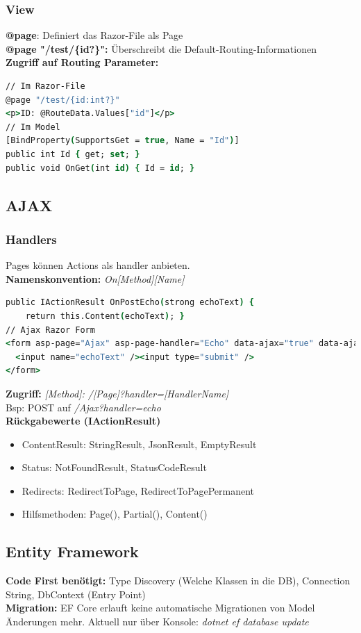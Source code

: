 \subsubsection{View}
\textbf{@page}: Definiert das Razor-File als Page\\
\textbf{@page "/test/\{id?\}":} Überschreibt die Default-Routing-Informationen\\
\textbf{Zugriff auf Routing Parameter:}
\begin{lstlisting}[language=csh]
// Im Razor-File
@page "/test/{id:int?}"
<p>ID: @RouteData.Values["id"]</p>
// Im Model
[BindProperty(SupportsGet = true, Name = "Id")]
public int Id { get; set; }
public void OnGet(int id) { Id = id; }
\end{lstlisting}

\subsection{AJAX}
\subsubsection{Handlers}
Pages können Actions als handler anbieten.\\
\textbf{Namenskonvention:} \textit{On[Method][Name]}
\begin{lstlisting}[language=csh]
public IActionResult OnPostEcho(strong echoText) {
    return this.Content(echoText); }
// Ajax Razor Form
<form asp-page="Ajax" asp-page-handler="Echo" data-ajax="true" data-ajax-method="POST" data-ajax-mode="replace" data-ajax-update="#output">
  <input name="echoText" /><input type="submit" />
</form>
\end{lstlisting}
\textbf{Zugriff:} \textit{[Method]: /[Page]?handler=[HandlerName]}\\
Bsp: POST auf \textit{/Ajax?handler=echo}\\
\textbf{Rückgabewerte (IActionResult)}
\begin{itemize}
    \item ContentResult: StringResult, JsonResult, EmptyResult
    \item Status: NotFoundResult, StatusCodeResult
    \item Redirects: RedirectToPage, RedirectToPagePermanent
    \item Hilfsmethoden: Page(), Partial(), Content()
\end{itemize}

\subsection{Entity Framework}
\textbf{Code First benötigt:} Type Discovery (Welche Klassen in die DB), Connection String, DbContext (Entry Point)\\
\textbf{Migration:} EF Core erlauft keine automatische Migrationen von Model Änderungen mehr.
Aktuell nur über Konsole: \textit{dotnet ef database update}
